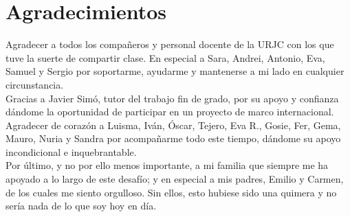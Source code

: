\chapter*{Agradecimientos}
\thispagestyle{empty}
\label{cap:agradecimientos}
Agradecer a todos los compañeros y personal docente de la URJC con los que tuve la suerte de compartir clase. En especial a Sara, Andrei, Antonio, Eva, Samuel y Sergio por soportarme, ayudarme y mantenerse a mi lado en cualquier circunstancia.\\

Gracias a Javier Simó, tutor del trabajo fin de grado, por su apoyo y confianza dándome la oportunidad de participar en un proyecto de marco internacional.\\ 


Agradecer de corazón a Luisma, Iván, Óscar, Tejero, Eva R., Gosie, Fer, Gema, Mauro, Nuria y Sandra por acompañarme todo este tiempo, dándome su apoyo incondicional e inquebrantable.\\

Por último, y no por ello menos importante, a mi familia que siempre me ha apoyado a lo largo de este desafío; y en especial a mis padres, Emilio y Carmen, de los cuales me siento orgulloso. Sin ellos, esto hubiese sido una quimera y no sería nada de lo que soy hoy en día.

\afterpage{\null\newpage}
\pagestyle{empty}
